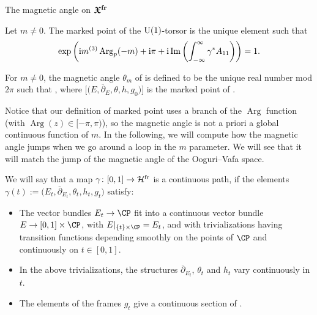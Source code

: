 \begin{subsubsection}{The magnetic angle on $\boldsymbol{\mathfrak{X}^{{\rm fr}}}$}
\begin{Definition} Let $m\neq 0$. The marked point of the ${\rm U}(1)$-torsor  is the unique element  such that
\begin{equation*}
 \exp \left({\rm i}m^{(3)}\operatorname{Arg}_p(-m)+{\rm i}\pi +{\rm i}\operatorname{Im}\left(\int_{-\infty}^{\infty}\gamma^*A_{11}\right)\right)=1 .
\end{equation*}
\end{Definition}
\begin{Definition}\label{magangledef} For $m \neq 0$, the magnetic angle $\theta_m$ of  is defined to be the unique real number mod $2\pi$ such that
,
where $\bigl[\bigl(E,\overline{\partial}_E,\theta,h,g_0\bigr)\bigr]$ is the marked point of .
\end{Definition}

Notice that our definition of marked point uses a branch of the $\operatorname{Arg}$ function (with $\operatorname{Arg}(z)\in [-\pi,\pi)$), so the magnetic angle is not a priori a global continuous function of $m$. In the following, we will compute how the magnetic angle jumps when we go around a loop in the $m$ parameter. We will see that it will match the jump of the magnetic angle of the Ooguri--Vafa space.

\begin{Definition} We will say that a map $\gamma\colon [0,1]\to \mathcal{H}^{\textnormal{fr}}$ is a continuous path, if the elements~${\gamma(t):=\bigl(E_t,\overline{\partial}_{E_t},\theta_t,h_t,g_t\bigr)}$ satisfy:
\begin{itemize}\itemsep=0pt
 \item The vector bundles $E_t\to \CP$ fit into a continuous vector bundle $E\to [0,1]\times \CP$, with $E|_{\{t\}\times \CP}=E_t$, and with trivializations having transition functions depending smoothly on the points of $\CP$ and continuously on $t\in [0,1]$.
 \item In the above trivializations, the structures $\overline{\partial}_{E_t}$, $\theta_t$ and $h_t$ vary continuously in $t$.
 \item The elements of the frames $g_t$ give a continuous section of .
\end{itemize}


\end{Definition}
\end{subsubsection}
